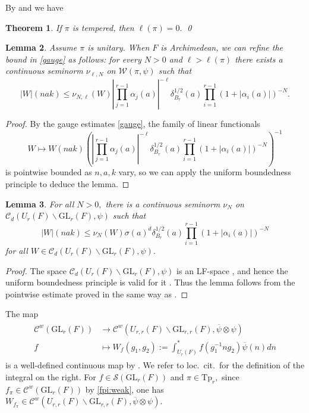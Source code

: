 \documentclass[12pt]{amsart}
\newtheorem{thm}{Theorem}[section]
\newtheorem{lem}[thm]{Lemma}
\theoremstyle{remark}
\numberwithin{equation}{section}
\newcommand{\GL}{\mathrm{GL}}
\newcommand{\lto}{\longrightarrow}
\theoremstyle{definition}
\numberwithin{equation}{subsection}
\begin{document}
By \cite[Proposition 2.5]{JacquetShalika:Whittaker} and \cite[Proposition 3.5]{JacquetPerfectRS} we have
\begin{thm}  \label{thm:exponent}
If $\pi$ is tempered, then $\ell(\pi)=0.$   \qed
\end{thm}



\begin{lem} \label{lem:refine:gauge}
Assume $\pi$ is unitary.  When $F$ is Archimedean, we can refine the bound in \eqref{gauge} as follows: for every $N>0$ and $\ell>\ell(\pi)$ there exists a continuous seminorm $\nu_{\ell,N}$ on $\mathcal{W}(\pi,\psi)$ such that 
$$
|W|(nak)\le\nu_{N,\ell}(W)\left|\prod_{j=1}^{r-1} \alpha_j(a) \right|^{-\ell}\delta_{B_r}^{1/2}(a)\prod_{i=1}^{r-1}(1+|\alpha_i(a)|)^{-N}.
$$
\end{lem}
\begin{proof}
By the gauge estimates \eqref{gauge}, the family of linear functionals 
$$
W \longmapsto W(nak)\left(\left|\prod_{j=1}^{r-1} \alpha_j(a) \right|^{-\ell}\delta_{B_r}^{1/2}(a)\prod_{i=1}^{r-1}(1+|\alpha_i(a)|)^{-N}\right)^{-1}
$$
is pointwise bounded as $n,a,k$ vary, so we can apply the uniform boundedness principle to deduce the lemma.  
\end{proof}

\begin{lem} \label{lem:C:gauge}
 For all $N>0,$ there is a continuous seminorm $\nu_N$ on $\mathcal{C}_d(U_r(F) \backslash \GL_r(F),\psi)$ such that 
$$
|W|(nak)\le\nu_N(W)\sigma(a)^d\delta_{B_r}^{1/2}(a)\prod_{i=1}^{r-1}(1+|\alpha_i(a)|)^{-N}
$$
for all $W \in \mathcal{C}_d(U_r(F) \backslash \GL_r(F),\psi).$
\end{lem}
\begin{proof}
The space $\mathcal{C}_d(U_r(F) \backslash \GL_r(F),\psi)$ is an LF-space \cite[\S 2.4]{BP:GLn}, and hence the uniform boundedness principle is valid for it \cite[\S 33]{Treves}. Thus the lemma follows from the pointwise estimate proved in the same way as \cite[Lemma 2.5.1]{BP:Asai}.
\end{proof}

The map 
 \begin{align} \label{Whitt} \begin{split}
     \mathcal{C}^w(\GL_r(F))  &\lto  \mathcal{C}^w(U_{r,r}(F) \backslash \GL_{r,r}(F),\overline{\psi} \otimes \psi)\\
     f &\longmapsto W_f(g_1,g_2):=\int_{U_r(F)}^\ast f(g_1^{-1}ng_2)\overline{\psi}(n)dn \end{split}
 \end{align}
is a well-defined continuous map by \cite[Lemma 2.14.1]{BP:GLn}.  We refer to  loc.~cit.~for the definition of the integral on the right. For $f \in \mathcal{S}(\GL_r(F))$ and $\pi \in \mathrm{Tp}_r,$ since $f_{\pi}\in  \mathcal{C}^w(\GL_r(F))$ by \eqref{fpi:weak},
one has $W_{f_{\pi}} \in \mathcal{C}^w(U_{r,r}(F) \backslash \GL_{r,r}(F),\overline{\psi} \otimes \psi).$
\end{document}
